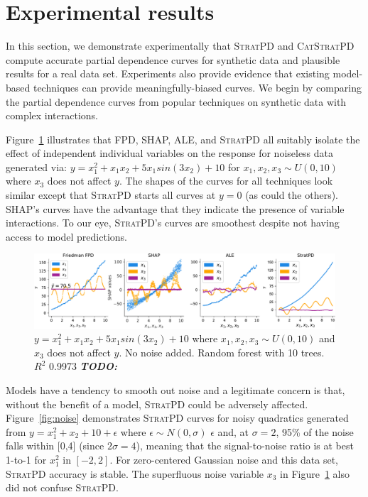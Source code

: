 \documentclass{article}
\newcommand{\figref}[1]{Figure~\ref{#1}}
\newcommand{\todo}[1]{{\bf\em TODO:} {{\color{red}{#1}}}}
\newcommand{\spd}{\fontfamily{cmr}\textsc{\small StratPD}}
\newcommand{\cspd}{\fontfamily{cmr}\textsc{\small CatStratPD}}
\begin{document}
\section{Experimental results}\label{sec:experiments} 

In this section, we demonstrate experimentally that \spd{} and \cspd{} compute accurate partial dependence curves for synthetic data and plausible results for a real data set. Experiments also provide evidence that existing model-based techniques can provide meaningfully-biased curves. We begin by comparing the partial dependence curves from popular techniques on synthetic data with complex interactions.

\figref{fig:interactions} illustrates that FPD, SHAP, ALE, and \spd{} all suitably isolate the effect of independent individual variables on the response for noiseless data generated via: $y = x_1^2 + x_1 x_2 + 5 x_1 sin(3 x_2) + 10$ for $x_1,x_2,x_3 \sim U(0,10)$ where $x_3$ does not affect $y$. The shapes of the curves for all techniques look similar except that \spd{} starts all curves at $y=0$ (as could the others). SHAP's curves have the advantage that they indicate the presence of variable interactions. To our eye, \spd's curves are smoothest despite not having access to model predictions.

\begin{figure}[htbp]
\begin{center}
\includegraphics[scale=0.45]{images/interactions.pdf}
\caption{\small $y = x_1^2 + x_1 x_2 + 5 x_1 sin(3 x_2) + 10$ where $x_1,x_2,x_3 \sim U(0,10)$ and $x_3$ does not affect $y$. No noise added. Random forest with 10 trees. $R^2$  0.9973 \todo{why is SHAP showing a pinched blue spread in the middle for $x_1$?}}
\label{fig:interactions}
\end{center}
\end{figure}

Models have a tendency to smooth out noise and a legitimate concern is that, without the benefit of a model, \spd{} could be adversely affected. \figref{fig:noise} demonstrates \spd{} curves for noisy quadratics generated from $y = x_1^2 + x_2 + 10 + \epsilon$ where $\epsilon \sim N(0,\sigma)$ $\epsilon$ and, at $\sigma=2$, 95\% of the noise falls within [0,4] (since $2\sigma = 4$), meaning that the signal-to-noise ratio is at best 1-to-1 for $x_1^2$ in $[-2,2]$. For zero-centered Gaussian noise and this data set, \spd{} accuracy is stable.  The superfluous noise variable $x_3$ in \figref{fig:interactions} also did not confuse \spd.
\end{document}
